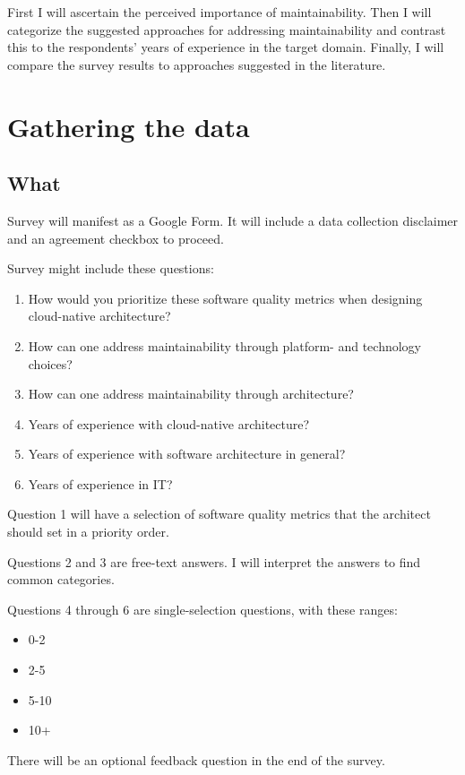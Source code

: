 \documentclass[utf8,english]{gradu3}
\begin{document}
First I will ascertain the perceived importance of maintainability.
Then I will categorize the suggested approaches for addressing maintainability
and contrast this to the respondents' years of experience in the target domain.
Finally, I will compare the survey results to approaches suggested in the literature.


\chapter{Gathering the data}

\section{What}
Survey will manifest as a Google Form.
It will include a data collection disclaimer and an agreement checkbox to proceed.

Survey might include these questions:
\begin{enumerate}
  \item How would you prioritize these software quality metrics when designing cloud-native
        architecture?
  \item How can one address maintainability through platform- and technology choices?
  \item How can one address maintainability through architecture?
  \item Years of experience with cloud-native architecture?
  \item Years of experience with software architecture in general?
  \item Years of experience in IT?
\end{enumerate}

Question 1 will have a selection of software quality metrics that the architect should set in a priority order.

Questions 2 and 3 are free-text answers.
I will interpret the answers to find common categories.

Questions 4 through 6 are single-selection questions, with these ranges:
\begin{itemize}
  \item 0-2
  \item 2-5
  \item 5-10
  \item 10+
\end{itemize}

There will be an optional feedback question in the end of the survey.
\end{document}
